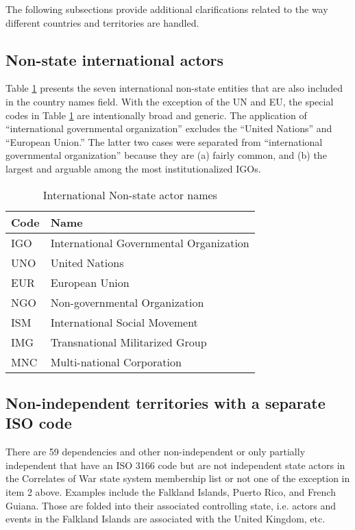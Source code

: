 \documentclass[11pt]{report}
\begin{document}
The following subsections provide additional clarifications related to the way different countries and territories are handled.

\subsection{Non-state international actors}

Table \ref{tab:nonstate} presents the seven international non-state entities that are also included in the country names field. With the exception of the UN and EU, the special codes in Table \ref{tab:nonstate} are intentionally broad and generic. The application of ``international governmental organization'' excludes the ``United Nations'' and ``European Union.'' The latter two cases were separated from ``international governmental organization'' because they are (a) fairly common, and (b) the largest and arguable among the most institutionalized IGOs.

\begin{table}[htp]
\caption{International Non-state actor names}
\begin{center}
\begin{tabular}{|l|l|}
\hline
Code & Name \\
\hline
IGO   &   International Governmental Organization \\
UNO & United Nations \\
EUR & European Union \\
NGO &   Non-governmental Organization\\
ISM           &   International Social Movement\\
IMG            &   Transnational Militarized Group\\
MNC            &   Multi-national Corporation\\
\hline
\end{tabular}
\end{center}
\label{tab:nonstate}
\end{table}%

\subsection{Non-independent territories with a separate ISO code}

There are 59 dependencies and other non-independent or only partially independent that have an ISO 3166 code but are not independent state actors in the Correlates of War state system membership list or not one of the exception in item 2 above. Examples include the Falkland Islands, Puerto Rico, and French Guiana. Those are folded into their associated controlling state, i.e. actors and events in the Falkland Islands are associated with the United Kingdom, etc.
\end{document}
